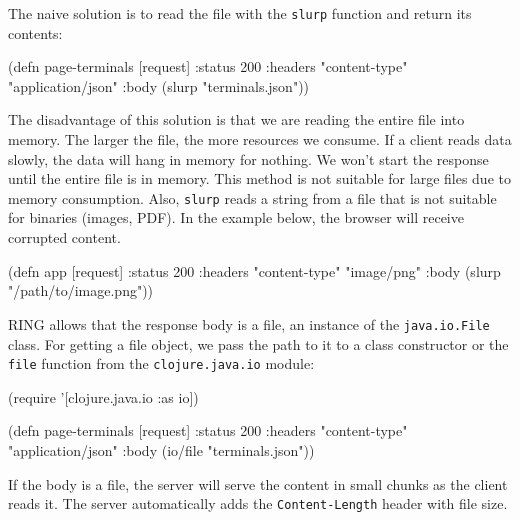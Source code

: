 
The naive solution is to read the file with the \verb|slurp| function and return its contents:

\begin{english}
\begin{clojure}
(defn page-terminals [request]
{:status 200
:headers {"content-type" "application/json"}
:body (slurp "terminals.json")})
\end{clojure}
\end{english}

The disadvantage of this solution is that we are reading the entire file into memory. The larger the file, the more resources we consume. If a client reads data slowly, the data will hang in memory for nothing. We won't start the response until the entire file is in memory. This method is not suitable for large files due to memory consumption. Also, \verb|slurp| reads a string from a file that is not suitable for binaries (images, PDF). In the example below, the browser will receive corrupted content.

\begin{english}
\begin{clojure}
(defn app [request]
{:status 200
:headers {"content-type" "image/png"}
:body (slurp "/path/to/image.png")})
\end{clojure}
\end{english}


RING allows that the response body is a file, an instance of the \verb|java.io.File| class. For getting a file object, we pass the path to it to a class constructor or the \verb|file| function from the \verb|clojure.java.io| module:

\begin{english}
\begin{clojure}
(require '[clojure.java.io :as io])

(defn page-terminals
[request]
{:status 200
:headers {"content-type" "application/json"}
:body (io/file "terminals.json")})
\end{clojure}
\end{english}


If the body is a file, the server will serve the content in small chunks as the client reads it. The server automatically adds the \verb|Content-Length| header with file size.

